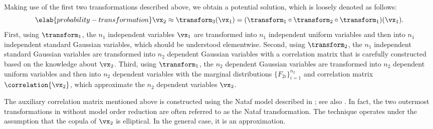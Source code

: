 Making use of the first two transformations described above, we obtain a
potential solution, which is loosely denoted as follows:
\begin{equation} \elab{probability-transformation}
  \vx_2 \approx \transform_3(\vx_1) = (\transform_1 \circ \transform_2 \circ \transform_1)(\vx_1).
\end{equation}
First, using $\transform_1$, the $n_1$ independent variables $\vx_1$ are
transformed into $n_1$ independent uniform variables and then into $n_1$
independent standard Gaussian variables, which should be understood elementwise.
Second, using $\transform_2$, the $n_1$ independent standard Gaussian variables
are transformed into $n_2$ dependent Gaussian variables with a correlation
matrix that is carefully constructed based on the knowledge about $\vx_2$.
Third, using $\transform_1$, the $n_2$ dependent Gaussian variables are
transformed into $n_2$ dependent uniform variables and then into $n_2$ dependent
variables with the marginal distributions $\{ F_{2i} \}_{i = 1}^{n_2}$ and
correlation matrix $\correlation{\vx_2}$, which approximate the $n_2$ dependent
variables $\vx_2$.

The auxiliary correlation matrix mentioned above is constructed using the Nataf
model described in \cite{liu1986}; see also \cite{li2008}. In fact, the two
outermost transformations in  without model
order reduction are often referred to as the Nataf transformation. The technique
operates under the assumption that the copula of $\vx_2$ is elliptical. In the
general case, it is an approximation.
